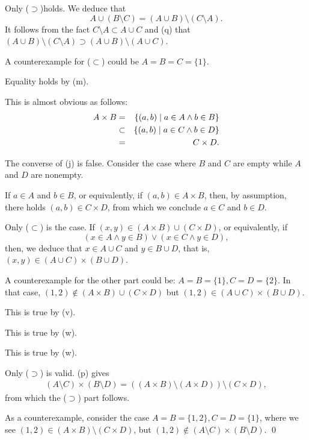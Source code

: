 \documentclass[a4paper,12pt]{article}
\begin{document}
\begin{sol}
	Only (\( \supset \))holds.
	We deduce that
	\begin{equation*}
		A \cup (B \setminus C)
		=
		(A\cup B)\setminus (C\setminus A).
	\end{equation*}
	It follows from the fact
	\( C\setminus A \subset A \cup C \)
	and
	 (q)
	that
	\( (A\cup B)\setminus (C\setminus A)
	\supset
	(A\cup B) \setminus (A\cup C)\).
	
	A counterexample for (\( \subset \)) could be \( A=B=C=\{1\} \).
	
	Equality holds by  (m).
	
	This is almost obvious as follows:
	\begin{eqnarray*}
		A\times B
		&=&
		\left\{ (a,b) \;|\; a \in A \wedge b \in B \right\}\\
		&\subset&
		\left\{ (a,b) \;|\; a\in C \wedge b \in D \right\}\\
		&=&
		C \times D.
	\end{eqnarray*}
	
	The converse of (j) is false.
	Consider the case where \( B \) and \( C \) are empty
	while \( A \) and \( D \) are nonempty.
	
	\fbox{(\(\ell\))}
	If \( a\in A \) and \( b \in B \),
	or equivalently, if
	\( (a,b)\in A\times B \),
	then, by assumption, there holds
	\( (a,b)\in C\times D \),
	from which we conclude \( a\in C \) and \( b \in D \).
	
	Only (\( \subset \)) is the case.
	If \( (x,y) \in (A\times B)\cup (C \times D) \),
	or equivalently, if
	\begin{equation*}
		( x \in A \wedge y\in B) \vee ( x \in C \wedge y\in D),
	\end{equation*}
	then, we deduce that
	\( x\in A\cup C \) and \( y \in B\cup D \),
	that is,
	\( (x,y) \in (A\cup C)\times (B\cup D) \).
	
	A counterexample for the other part could be:
	\( A=B=\{1\},C=D= \{2\}\).
	In that case,
	\( (1,2)\notin (A\times B)\cup (C \times D)\)
	but
	\( (1,2)\in (A\cup C)\times (B\cup D)\).
	
	This is true by  (v).
	
	This is true by  (w).
	
	This is true by  (w).
	
	Only (\( \supset \)) is valid.
	(p) gives
	\begin{eqnarray*}
		(A \setminus C) \times (B \setminus D)
		=
		\left( (A \times B)\setminus (A\times D) \right) \setminus (C \times D),
	\end{eqnarray*}
	from which the (\( \supset \)) part follows.
	
	As a counterexample, consider the case \( A=B=\{1,2\},C=D=\{1\}\),
	where we see
	\( (1,2)\in (A \times B)\setminus (C\times D) \),
	but
	\( (1,2)\notin (A \setminus C)\times (B \setminus D) \).
	\qed\end{sol}
\end{document}
